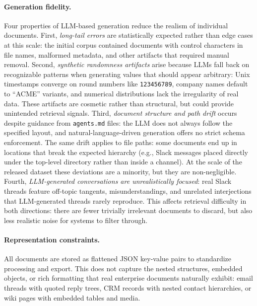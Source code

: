 \documentclass{article}
\begin{document}
\paragraph{Generation fidelity.}
Four properties of LLM-based generation reduce the realism of individual documents. First, \textit{long-tail errors} are statistically expected rather than edge cases at this scale: the initial corpus contained documents with control characters in file names, malformed metadata, and other artifacts that required manual removal. Second, \textit{synthetic randomness artifacts} arise because LLMs fall back on recognizable patterns when generating values that should appear arbitrary: Unix timestamps converge on round numbers like \texttt{123456789}, company names default to ``ACME'' variants, and numerical distributions lack the irregularity of real data. These artifacts are cosmetic rather than structural, but could provide unintended retrieval signals. Third, \textit{document structure and path drift} occurs despite guidance from \texttt{agents.md} files: the LLM does not always follow the specified layout, and natural-language-driven generation offers no strict schema enforcement. The same drift applies to file paths: some documents end up in locations that break the expected hierarchy (e.g., Slack messages placed directly under the top-level directory rather than inside a channel). At the scale of the released dataset these deviations are a minority, but they are non-negligible. Fourth, \textit{LLM-generated conversations are unrealistically focused}: real Slack threads feature off-topic tangents, misunderstandings, and unrelated interjections that LLM-generated threads rarely reproduce. This affects retrieval difficulty in both directions: there are fewer trivially irrelevant documents to discard, but also less realistic noise for systems to filter through.

\paragraph{Representation constraints.}
All documents are stored as flattened JSON key-value pairs to standardize processing and export. This does not capture the nested structures, embedded objects, or rich formatting that real enterprise documents naturally exhibit: email threads with quoted reply trees, CRM records with nested contact hierarchies, or wiki pages with embedded tables and media.
\end{document}
